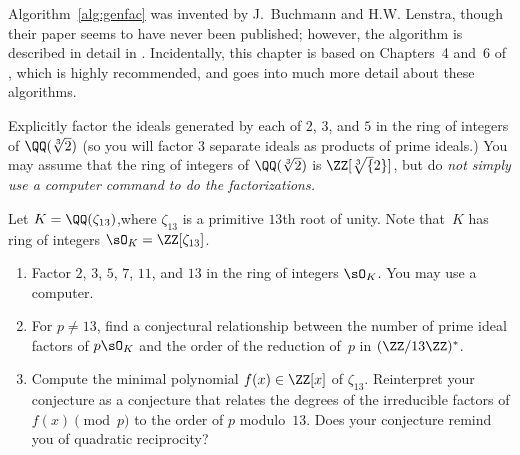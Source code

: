 Algorithm~\ref{alg:genfac} was invented by J.~Buchmann and
H.W. Lenstra, though their paper seems to have never been
published; however, the algorithm is described in detail in
\cite[\S6.2.5]{cohen:course_ant}.  Incidentally, this chapter is based
on Chapters~4 and~6 of \cite{cohen:course_ant}, which is highly
recommended, and goes into much more detail about these algorithms.

\begin{exercise}
  Explicitly factor the ideals generated by each of $2$, $3$, and $5$ in
  the ring of integers of $\QQ(\sqrt[3]{2})$ (so you will factor $3$
  separate ideals as products of prime ideals.)
  You may assume that the ring of integers of $\QQ(\sqrt[3]{2})$
  is $\ZZ[\sqrt[3]{2}]$, but do \em{not} simply use a computer command to do
  the factorizations.
\end{exercise}

\begin{exercise}
  Let $K=\QQ(\zeta_{13})$,where $\zeta_{13}$ is a primitive $13$th root of
  unity. Note that~$K$ has ring of integers $\sO_K=\ZZ[\zeta_{13}]$.
  \begin{enumerate}[label=(\alph*)]
    \item Factor $2$, $3$, $5$, $7$, $11$, and $13$ in the ring
    of integers $\sO_K$.  You may use a computer.
    \item For $p\neq 13$, find a conjectural
    relationship between the number of prime ideal factors of $p\sO_K$
    and the order of the reduction of~$p$  in $(\ZZ/13\ZZ)^*$.
    \item Compute the minimal polynomial $f(x)\in\ZZ[x]$ of $\zeta_{13}$.
    Reinterpret your conjecture as a conjecture that
    relates the degrees of the irreducible factors of $f(x)\pmod{p}$ to
    the order of $p$ modulo~$13$. Does your conjecture
    remind you of quadratic reciprocity?
  \end{enumerate}
\end{exercise}

